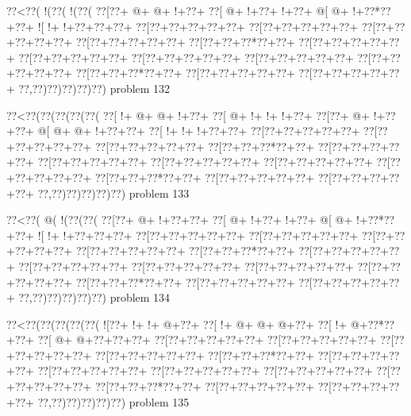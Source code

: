 \vbox{\vbox{\goo
\0??<\0??(\- !(\0??(\- !(\0??(
\0??[\0??+\- @+\- @+\- !+\0??+
\0??[\- @+\- !+\0??+\- !+\0??+
\- @[\- @+\- !+\0??*\0??+\0??+
\- ![\- !+\- !+\0??+\0??+\0??+
\0??[\0??+\0??+\0??+\0??+\0??+
\0??[\0??+\0??+\0??+\0??+\0??+
\0??[\0??+\0??+\0??+\0??+\0??+
\0??[\0??+\0??+\0??+\0??+\0??+
\0??[\0??+\0??+\0??*\0??+\0??+
\0??[\0??+\0??+\0??+\0??+\0??+
\0??[\0??+\0??+\0??+\0??+\0??+
\0??[\0??+\0??+\0??+\0??+\0??+
\0??[\0??+\0??+\0??+\0??+\0??+
\0??[\0??+\0??+\0??+\0??+\0??+
\0??[\0??+\0??+\0??*\0??+\0??+
\0??[\0??+\0??+\0??+\0??+\0??+
\0??[\0??+\0??+\0??+\0??+\0??+
\0??,\0??)\0??)\0??)\0??)\0??)
}
\hfil problem 132\hfil\break
}

\vbox{\vbox{\goo
\0??<\0??(\0??(\0??(\0??(\0??(
\0??[\- !+\- @+\- @+\- !+\0??+
\0??[\- @+\- !+\- !+\- !+\0??+
\0??[\0??+\- @+\- !+\0??+\0??+
\- @[\- @+\- @+\- !+\0??+\0??+
\0??[\- !+\- !+\- !+\0??+\0??+
\0??[\0??+\0??+\0??+\0??+\0??+
\0??[\0??+\0??+\0??+\0??+\0??+
\0??[\0??+\0??+\0??+\0??+\0??+
\0??[\0??+\0??+\0??*\0??+\0??+
\0??[\0??+\0??+\0??+\0??+\0??+
\0??[\0??+\0??+\0??+\0??+\0??+
\0??[\0??+\0??+\0??+\0??+\0??+
\0??[\0??+\0??+\0??+\0??+\0??+
\0??[\0??+\0??+\0??+\0??+\0??+
\0??[\0??+\0??+\0??*\0??+\0??+
\0??[\0??+\0??+\0??+\0??+\0??+
\0??[\0??+\0??+\0??+\0??+\0??+
\0??,\0??)\0??)\0??)\0??)\0??)
}
\hfil problem 133\hfil\break
}

\vbox{\vbox{\goo
\0??<\0??(\- @(\- !(\0??(\0??(
\0??[\0??+\- @+\- !+\0??+\0??+
\0??[\- @+\- !+\0??+\- !+\0??+
\- @[\- @+\- !+\0??*\0??+\0??+
\- ![\- !+\- !+\0??+\0??+\0??+
\0??[\0??+\0??+\0??+\0??+\0??+
\0??[\0??+\0??+\0??+\0??+\0??+
\0??[\0??+\0??+\0??+\0??+\0??+
\0??[\0??+\0??+\0??+\0??+\0??+
\0??[\0??+\0??+\0??*\0??+\0??+
\0??[\0??+\0??+\0??+\0??+\0??+
\0??[\0??+\0??+\0??+\0??+\0??+
\0??[\0??+\0??+\0??+\0??+\0??+
\0??[\0??+\0??+\0??+\0??+\0??+
\0??[\0??+\0??+\0??+\0??+\0??+
\0??[\0??+\0??+\0??*\0??+\0??+
\0??[\0??+\0??+\0??+\0??+\0??+
\0??[\0??+\0??+\0??+\0??+\0??+
\0??,\0??)\0??)\0??)\0??)\0??)
}
\hfil problem 134\hfil\break
}

\vbox{\vbox{\goo
\0??<\0??(\0??(\0??(\0??(\0??(
\- ![\0??+\- !+\- !+\- @+\0??+
\0??[\- !+\- @+\- @+\- @+\0??+
\0??[\- !+\- @+\0??*\0??+\0??+
\0??[\- @+\- @+\0??+\0??+\0??+
\0??[\0??+\0??+\0??+\0??+\0??+
\0??[\0??+\0??+\0??+\0??+\0??+
\0??[\0??+\0??+\0??+\0??+\0??+
\0??[\0??+\0??+\0??+\0??+\0??+
\0??[\0??+\0??+\0??*\0??+\0??+
\0??[\0??+\0??+\0??+\0??+\0??+
\0??[\0??+\0??+\0??+\0??+\0??+
\0??[\0??+\0??+\0??+\0??+\0??+
\0??[\0??+\0??+\0??+\0??+\0??+
\0??[\0??+\0??+\0??+\0??+\0??+
\0??[\0??+\0??+\0??*\0??+\0??+
\0??[\0??+\0??+\0??+\0??+\0??+
\0??[\0??+\0??+\0??+\0??+\0??+
\0??,\0??)\0??)\0??)\0??)\0??)
}
\hfil problem 135\hfil\break
}

